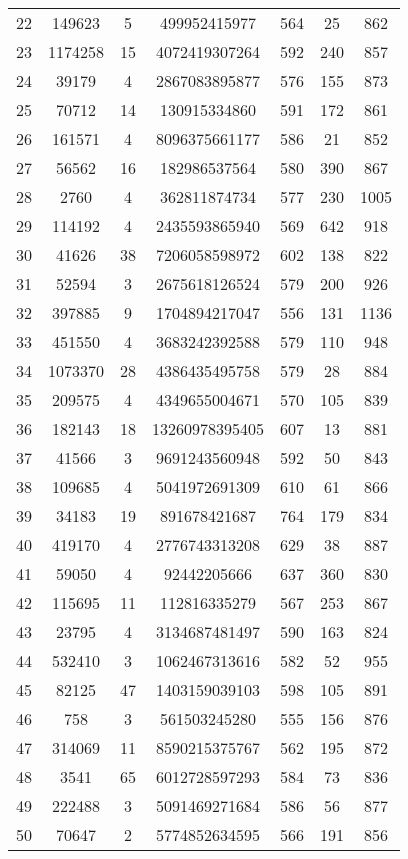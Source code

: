 \documentclass[tikz, 12pt]{scrartcl}
\begin{document}
\begin{longtable}{|c|cc|cc|cc|}
22	 &149623	 & 	5	 &499952415977	 & 	564	 &25	 & 	862\\
23	 &1174258	 & 	15	 &4072419307264	 & 	592	 &240	 & 	857\\
24	 &39179	 & 	4	 &2867083895877	 & 	576	 &155	 & 	873\\
25	 &70712	 & 	14	 &130915334860	 & 	591	 &172	 & 	861\\
26	 &161571	 & 	4	 &8096375661177	 & 	586	 &21	 & 	852\\
27	 &56562	 & 	16	 &182986537564	 & 	580	 &390	 & 	867\\
28	 &2760	 & 	4	 &362811874734	 & 	577	 &230	 & 	1005\\
29	 &114192	 & 	4	 &2435593865940	 & 	569	 &642	 & 	918\\
30	 &41626	 & 	38	 &7206058598972	 & 	602	 &138	 & 	822\\
31	 &52594	 & 	3	 &2675618126524	 & 	579	 &200	 & 	926\\
32	 &397885	 & 	9	 &1704894217047	 & 	556	 &131	 & 	1136\\
33	 &451550	 & 	4	 &3683242392588	 & 	579	 &110	 & 	948\\
34	 &1073370	 & 	28	 &4386435495758	 & 	579	 &28	 & 	884\\
35	 &209575	 & 	4	 &4349655004671	 & 	570	 &105	 & 	839\\
36	 &182143	 & 	18	 &13260978395405	 & 	607	 &13	 & 	881\\
37	 &41566	 & 	3	 &9691243560948	 & 	592	 &50	 & 	843\\
38	 &109685	 & 	4	 &5041972691309	 & 	610	 &61	 & 	866\\
39	 &34183	 & 	19	 &891678421687	 & 	764	 &179	 & 	834\\
40	 &419170	 & 	4	 &2776743313208	 & 	629	 &38	 & 	887\\
41	 &59050	 & 	4	 &92442205666	 & 	637	 &360	 & 	830\\
42	 &115695	 & 	11	 &112816335279	 & 	567	 &253	 & 	867\\
43	 &23795	 & 	4	 &3134687481497	 & 	590	 &163	 & 	824\\
44	 &532410	 & 	3	 &1062467313616	 & 	582	 &52	 & 	955\\
45	 &82125	 & 	47	 &1403159039103	 & 	598	 &105	 & 	891\\
46	 &758	 & 	3	 &561503245280	 & 	555	 &156	 & 	876\\
47	 &314069	 & 	11	 &8590215375767	 & 	562	 &195	 & 	872\\
48	 &3541	 & 	65	 &6012728597293	 & 	584	 &73	 & 	836\\
49	 &222488	 & 	3	 &5091469271684	 & 	586	 &56	 & 	877\\
50	 &70647	 & 	2	 &5774852634595	 & 	566	 &191	 & 	856\\
\hline
\end{longtable}
\end{document}

